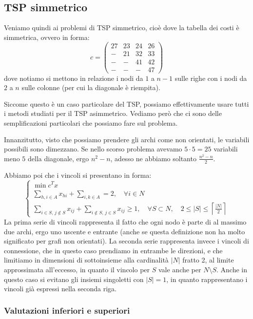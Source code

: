 \documentclass[a4paper,11pt]{article}
\begin{document}
\subsection{TSP simmetrico}
Veniamo quindi ai problemi di TSP simmetrico, cioè dove la tabella dei costi è simmetrica, ovvero in forma:
$$
c =
\begin{pmatrix}
	27 & 23 & 24 & 26 \\ 
	- & 21 & 32 & 33 \\ 
	- & - & 41 & 42 \\ 
	- & - & - & 47
\end{pmatrix}
$$
dove notiamo si mettono in relazione i nodi da $1$ a $n-1$ sulle righe con i nodi da $2$ a $n$ sulle colonne (per cui la diagonale è riempita).

Siccome questo è un caso particolare del TSP, possiamo effettivamente usare tutti i metodi studiati per il TSP asimmetrico.
Vediamo però che ci sono delle semplificazioni particolari che possiamo fare sul problema.

Innanzitutto, visto che possiamo prendere gli archi come non orientati, le variabili possibili sono dimezzano.
Se nello scorso problema avevamo $5 \cdot 5 = 25$ variabili meno $5$ della diagonale, ergo $n^2 - n$, adesso ne abbiamo soltanto $\frac{n^2 - n}{2}$. 

Abbiamo poi che i vincoli si presentano in forma:
\[
	\begin{cases}
		\min c^T x \\ 
		\sum\limits_{h,i \in A} x_{hi} + \sum\limits_{i,k \in A} = 2, \quad \forall i \in N \\
		\sum\limits_{i \in S, \, j \notin S} x_{ij} + \sum\limits_{i \notin S, \, j \in S} x_{ij} \geq 1, \quad \forall S \subset N, \quad 2 \leq |S| \leq \left\lceil \frac{|N|}{2} \right\rceil
	\end{cases}
\]
La prima serie di vincoli rappresenta il fatto che ogni nodo è parte di al massimo due archi, ergo uno uscente e entrante (anche se questa definizione non ha molto significato per grafi non orientati). 
La seconda serie rappresenta invece i vincoli di connessione, che in questo caso prendiamo in entrambe le direzioni, e che limitiamo in dimensioni di sottoinsieme alla cardinalità $|N|$ fratto 2, al limite approssimata all'eccesso, in quanto il vincolo per $S$ vale anche per $N \setminus S$. 
Anche in questo caso si evitano gli insiemi singoletti con $|S| = 1$, in quanto rappresentano i vincoli già espressi nella seconda riga.

\subsubsection{Valutazioni inferiori e superiori}
\end{document}
